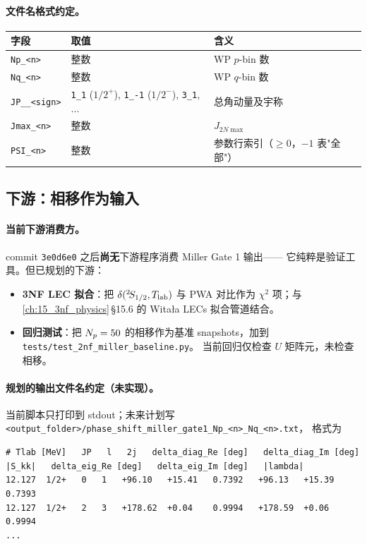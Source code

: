 \paragraph{文件名格式约定。}
\begin{tabularx}{\linewidth}{lXX}
\toprule
字段 & 取值 & 含义 \\
\midrule
\texttt{Np\_<n>} & 整数 & WP \(p\)-bin 数 \\
\texttt{Nq\_<n>} & 整数 & WP \(q\)-bin 数 \\
\texttt{JP\_<2J>\_<sign>} & \texttt{1\_1} (\(1/2^+\)), \texttt{1\_-1} (\(1/2^-\)),
\texttt{3\_1}, ... & 总角动量及宇称 \\
\texttt{Jmax\_<n>} & 整数 & \(J_{2N\max}\) \\
\texttt{PSI\_<n>} & 整数 & 参数行索引（\(\geq 0\)，\(-1\) 表"全部"） \\
\bottomrule
\end{tabularx}

\subsection{下游：相移作为输入}
\label{subsec:ch14-downstream}

\paragraph{当前下游消费方。}
commit \texttt{3e0d6e0} 之后\textbf{尚无}下游程序消费 Miller Gate 1 输出——
它纯粹是验证工具。但已规划的下游：
\begin{itemize}
  \item \textbf{3NF LEC 拟合}：把
        \(\delta({}^{2}\!S_{1/2}, T_{\rm lab})\) 与 PWA 对比作为
        \(\chi^2\) 项；与 \cref{ch:15_3nf_physics}\(\,\)\S 15.6 的
        Witała LECs 拟合管道结合。
  \item \textbf{回归测试}：把 \(N_p = 50\) 的相移作为基准
        snapshots，加到 \texttt{tests/test\_2nf\_miller\_baseline.py}。
        当前回归仅检查 \(U\) 矩阵元，未检查相移。
\end{itemize}

\paragraph{规划的输出文件名约定（未实现）。}
当前脚本只打印到 stdout；未来计划写
\texttt{<output\_folder>/phase\_shift\_miller\_gate1\_Np\_<n>\_Nq\_<n>.txt}，
格式为
\begin{verbatim}
# Tlab [MeV]   JP   l   2j   delta_diag_Re [deg]   delta_diag_Im [deg]   |S_kk|   delta_eig_Re [deg]   delta_eig_Im [deg]   |lambda|
12.127  1/2+   0   1   +96.10   +15.41   0.7392   +96.13   +15.39   0.7393
12.127  1/2+   2   3   +178.62  +0.04    0.9994   +178.59  +0.06    0.9994
...
\end{verbatim}

